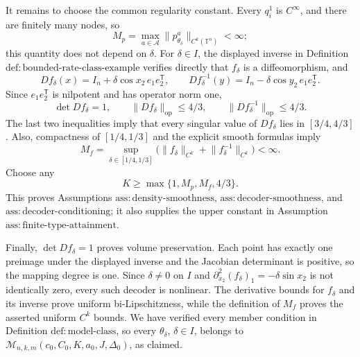 It remains to choose the common regularity constant.  Every \(q_i^1\) is \(C^\infty\), and there are finitely many nodes, so
\[
 M_p=\max_{a\in\mathcal A}\lVert p_{\theta_\delta}^a\rVert_{C^k(\mathbb T^n)}<\infty;
\]
this quantity does not depend on \(\delta\).  For \(\delta\in I\), the displayed inverse in Definition \(\mathrm{def:bounded\text{-}rate\text{-}class\text{-}example}\) verifies directly that \(f_\delta\) is a diffeomorphism, and
\[
 Df_\delta(x)=I_n+\delta\cos x_2\,e_1e_2^{\mathsf T},
 \qquad
 Df_\delta^{-1}(y)=I_n-\delta\cos y_2\,e_1e_2^{\mathsf T}.
\]
Since \(e_1e_2^{\mathsf T}\) is nilpotent and has operator norm one,
\[
 \det Df_\delta=1,
 \qquad
 \lVert Df_\delta\rVert_{\mathrm{op}}\leq4/3,
 \qquad
 \lVert Df_\delta^{-1}\rVert_{\mathrm{op}}\leq4/3.
\]
The last two inequalities imply that every singular value of \(Df_\delta\) lies in \([3/4,4/3]\).  Also, compactness of \([1/4,1/3]\) and the explicit smooth formulas imply
\[
 M_f=\sup_{\delta\in[1/4,1/3]}
 \bigl(\lVert f_\delta\rVert_{C^k}+\lVert f_\delta^{-1}\rVert_{C^k}\bigr)<\infty.
\]
Choose any
\[
 K\geq\max\{1,M_p,M_f,4/3\}.
\]
This proves Assumptions \(\mathrm{ass:density\text{-}smoothness}\), \(\mathrm{ass:decoder\text{-}smoothness}\), and \(\mathrm{ass:decoder\text{-}conditioning}\); it also supplies the upper constant in Assumption \(\mathrm{ass:finite\text{-}type\text{-}attainment}\).

Finally, \(\det Df_\delta=1\) proves volume preservation.  Each point has exactly one preimage under the displayed inverse and the Jacobian determinant is positive, so the mapping degree is one.  Since \(\delta\neq0\) on \(I\) and \(\partial_{x_2}^2(f_\delta)_1=-\delta\sin x_2\) is not identically zero, every such decoder is nonlinear.  The derivative bounds for \(f_\delta\) and its inverse prove uniform bi-Lipschitzness, while the definition of \(M_f\) proves the asserted uniform \(C^k\) bounds.  We have verified every member condition in Definition \(\mathrm{def:model\text{-}class}\), so every \(\theta_\delta\), \(\delta\in I\), belongs to \(\mathcal M_{n,k,m}(c_0,C_0,K,a_0,J,\Delta_0)\), as claimed.
